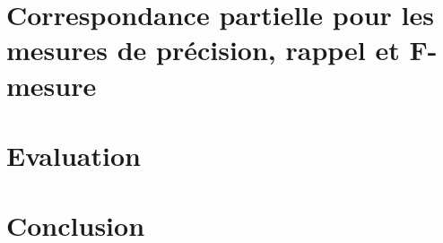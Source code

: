     \section{Correspondance partielle pour les mesures de précision, rappel et F-mesure}
    \label{sec:main-automatic_evaluation_of_keyphrase_annotation-contributions-evaluation-soft_maching_precision_recall_and_f_measure}

    \section{Evaluation}
    \label{sec:main-automatic_evaluation_of_keyphrase_annotation-contributions-evaluation-evaluation}

    \section{Conclusion}
    \label{sec:main-automatic_evaluation_of_keyphrase_annotation-contributions-evaluation-conclusion}

